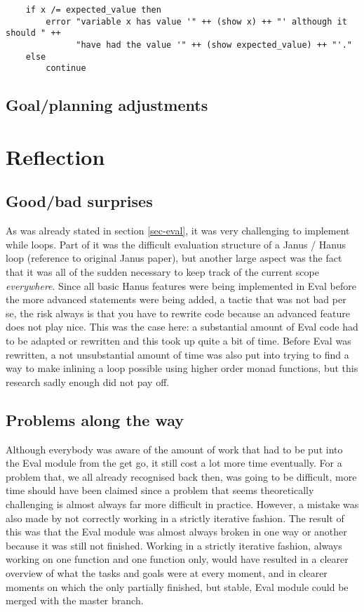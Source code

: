 \documentclass[12pt,a4paper]{article}
\begin{document}
\begin{verbatim}
    if x /= expected_value then
        error "variable x has value '" ++ (show x) ++ "' although it should " ++
              "have had the value '" ++ (show expected_value) ++ "'."
    else
        continue
\end{verbatim}
    
    \subsection{Goal/planning adjustments}
\section{Reflection}
    \subsection{Good/bad surprises}
        As was already stated in section \ref{sec-eval}, it was very challenging to implement while loops. Part of it was the difficult evaluation structure of a Janus / Hanus loop (reference to original Janus paper), but another large aspect was the fact that it was all of the sudden necessary to keep track of the current scope \emph{everywhere}. Since all basic Hanus features were being implemented in Eval before the more advanced statements were being added, a tactic that was not bad per se, the risk always is that you have to rewrite code because an advanced feature does not play nice. This was the case here: a substantial amount of Eval code had to be adapted or rewritten and this took up quite a bit of time. Before Eval was rewritten, a not unsubstantial amount of time was also put into trying to find a way to make inlining a loop possible using higher order monad functions, but this research sadly enough did not pay off.

    \subsection{Problems along the way}
        Although everybody was aware of the amount of work that had to be put into the Eval module from the get go, it still cost a lot more time eventually. For a problem that, we all already recognised back then, was going to be difficult, more time should have been claimed since a problem that seems theoretically challenging is almost always far more difficult in practice. However, a mistake was also made by not correctly working in a strictly iterative fashion. The result of this was that the Eval module was almost always broken in one way or another because it was still not finished. Working in a strictly iterative fashion, always working on one function and one function only, would have resulted in a clearer overview of what the tasks and goals were at every moment, and in clearer moments on which the only partially finished, but stable, Eval module could be merged with the master branch.
        
\end{document}
